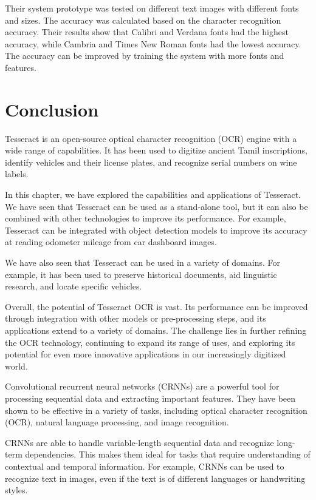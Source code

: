 Their system prototype was tested on different text images with different fonts and sizes. The accuracy was calculated based on the character recognition accuracy. Their results show that Calibri and Verdana fonts had the highest accuracy, while Cambria and Times New Roman fonts had the lowest accuracy.  The accuracy can be improved by training the system with more fonts and features. \cite{hossainOpticalCharacterRecognition2019}

\newpage
\section{Conclusion}

Tesseract is an open-source optical character recognition (OCR) engine with a wide range of capabilities. It has been used to digitize ancient Tamil inscriptions, identify vehicles and their license plates, and recognize serial numbers on wine labels.

In this chapter, we have explored the capabilities and applications of Tesseract. We have seen that Tesseract can be used as a stand-alone tool, but it can also be combined with other technologies to improve its performance. For example, Tesseract can be integrated with object detection models to improve its accuracy at reading odometer mileage from car dashboard images.

We have also seen that Tesseract can be used in a variety of domains. For example, it has been used to preserve historical documents, aid linguistic research, and locate specific vehicles.

Overall, the potential of Tesseract OCR is vast. Its performance can be improved through integration with other models or pre-processing steps, and its applications extend to a variety of domains. The challenge lies in further refining the OCR technology, continuing to expand its range of uses, and exploring its potential for even more innovative applications in our increasingly digitized world.

Convolutional recurrent neural networks (CRNNs) are a powerful tool for processing sequential data and extracting important features. They have been shown to be effective in a variety of tasks, including optical character recognition (OCR), natural language processing, and image recognition.

CRNNs are able to handle variable-length sequential data and recognize long-term dependencies. This makes them ideal for tasks that require understanding of contextual and temporal information. For example, CRNNs can be used to recognize text in images, even if the text is of different languages or handwriting styles.

